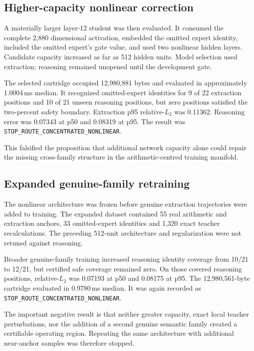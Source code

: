 \subsection{Higher-capacity nonlinear correction}

A materially larger layer-12 student was then evaluated.  It consumed the
complete 2,880 dimensional activation, embedded the omitted expert identity,
included the omitted expert's gate value, and used two nonlinear hidden
layers.  Candidate capacity increased as far as 512 hidden units.  Model
selection used extraction; reasoning remained unopened until the development
gate.

The selected cartridge occupied 12,980,881 bytes and evaluated in
approximately 1.0004\,ms median.  It recognized omitted-expert identities for
9 of 22 extraction positions and 10 of 21 unseen reasoning positions, but
zero positions satisfied the two-percent safety boundary.  Extraction p95
relative-$L_2$ was 0.11362.  Reasoning error was 0.07343 at p50 and 0.08319 at
p95.  The result was
\texttt{STOP\_ROUTE\_CONCENTRATED\_NONLINEAR}.

This falsified the proposition that additional network capacity alone could
repair the missing cross-family structure in the arithmetic-centred training
manifold.

\subsection{Expanded genuine-family retraining}

The nonlinear architecture was frozen before genuine extraction trajectories
were added to training.  The expanded dataset contained 55 real arithmetic
and extraction anchors, 33 omitted-expert identities and 1,320 exact teacher
recalculations.  The preceding 512-unit architecture and regularization were
not retuned against reasoning.

Broader genuine-family training increased reasoning identity coverage from
10/21 to 12/21, but certified safe coverage remained zero.  On those covered
reasoning positions, relative-$L_2$ was 0.07193 at p50 and 0.08175 at p95.
The 12,980,561-byte cartridge evaluated in 0.9780\,ms median.  It was again
recorded as \texttt{STOP\_ROUTE\_CONCENTRATED\_NONLINEAR}.

The important negative result is that neither greater capacity, exact local
teacher perturbations, nor the addition of a second genuine semantic family
created a certifiable operating region.  Repeating the same architecture with
additional near-anchor samples was therefore stopped.

